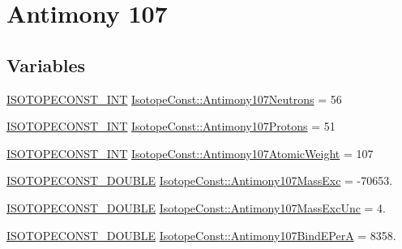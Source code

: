 \hypertarget{group___isotope_const-_antimony-_sb107}{}\section{Antimony 107}
\label{group___isotope_const-_antimony-_sb107}
\subsection*{Variables}
\begin{DoxyCompactItemize}
\item 
\mbox{\hyperlink{group___isotope_const-_macros_ga5f18360b3e99483a35c32d789e62621c}{I\+S\+O\+T\+O\+P\+E\+C\+O\+N\+S\+T\+\_\+\+I\+NT}} \mbox{\hyperlink{group___isotope_const-_antimony-_sb107_ga582073be020caad768c0e952518c7037}{Isotope\+Const\+::\+Antimony107\+Neutrons}} = 56
\item 
\mbox{\hyperlink{group___isotope_const-_macros_ga5f18360b3e99483a35c32d789e62621c}{I\+S\+O\+T\+O\+P\+E\+C\+O\+N\+S\+T\+\_\+\+I\+NT}} \mbox{\hyperlink{group___isotope_const-_antimony-_sb107_ga0d627ce60f57eb21f924ee52b7df4ca9}{Isotope\+Const\+::\+Antimony107\+Protons}} = 51
\item 
\mbox{\hyperlink{group___isotope_const-_macros_ga5f18360b3e99483a35c32d789e62621c}{I\+S\+O\+T\+O\+P\+E\+C\+O\+N\+S\+T\+\_\+\+I\+NT}} \mbox{\hyperlink{group___isotope_const-_antimony-_sb107_ga1121cea08c5a8efefb052973da0c3e77}{Isotope\+Const\+::\+Antimony107\+Atomic\+Weight}} = 107
\item 
\mbox{\hyperlink{group___isotope_const-_macros_ga8f45a7272ce02c0b4c65c44636ed719a}{I\+S\+O\+T\+O\+P\+E\+C\+O\+N\+S\+T\+\_\+\+D\+O\+U\+B\+LE}} \mbox{\hyperlink{group___isotope_const-_antimony-_sb107_ga7affb356e597bdfa05ffe8e77a4ad812}{Isotope\+Const\+::\+Antimony107\+Mass\+Exc}} = -\/70653.
\item 
\mbox{\hyperlink{group___isotope_const-_macros_ga8f45a7272ce02c0b4c65c44636ed719a}{I\+S\+O\+T\+O\+P\+E\+C\+O\+N\+S\+T\+\_\+\+D\+O\+U\+B\+LE}} \mbox{\hyperlink{group___isotope_const-_antimony-_sb107_gaf8156b80879f896886e7417eea97f6b7}{Isotope\+Const\+::\+Antimony107\+Mass\+Exc\+Unc}} = 4.
\item 
\mbox{\hyperlink{group___isotope_const-_macros_ga8f45a7272ce02c0b4c65c44636ed719a}{I\+S\+O\+T\+O\+P\+E\+C\+O\+N\+S\+T\+\_\+\+D\+O\+U\+B\+LE}} \mbox{\hyperlink{group___isotope_const-_antimony-_sb107_gaf2343fd07397d5a4c654e89006f15f5a}{Isotope\+Const\+::\+Antimony107\+Bind\+E\+PerA}} = 8358.
\item 

\end{DoxyCompactItemize}
